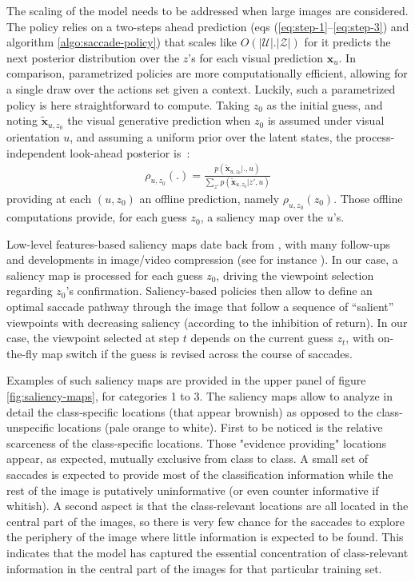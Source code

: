 \documentclass{article}
\begin{document}
The scaling of the model needs to be addressed when large images are considered. The policy relies on a two-steps ahead prediction (eqs (\ref{eq:step-1}--\ref{eq:step-3}) and algorithm \ref{algo:saccade-policy}) that scales like $O(|\mathcal{U}|.|\mathcal{Z}|)$ for it predicts the next posterior distribution over the $z$'s for each visual prediction $\boldsymbol{x}_u$. In comparison, parametrized policies are more computationally efficient, allowing for a single draw over the actions set given a context.
Luckily, such a parametrized policy is here straightforward to compute. Taking $z_0$ as the initial guess, and noting $\tilde{\boldsymbol{x}}_{u,z_0}$ the visual generative prediction when $z_0$ is assumed under visual orientation $u$, and assuming a uniform prior over the latent states, the process-independent look-ahead posterior is~:
\begin{align}
\rho_{u, z_0} (.)=  \frac{p(\tilde{\boldsymbol{x}}_{u, z_0}|.,u)}{\sum_{z'} p(\tilde{\boldsymbol{x}}_{u, z_0}|z',u)}
\end{align}
providing at each $(u, z_0)$ an offline prediction, namely $\rho_{u, z_0}(z_0)$. Those offline computations provide, for each guess $z_0$, a saliency map over the $u$'s. 

Low-level features-based saliency maps date back from \cite{itti2001computational}, with many follow-ups and developments in image/video compression (see for instance \cite{wang2003foveation}). In our case, a saliency map is processed for each guess $z_0$, driving the viewpoint selection regarding $z_0$'s confirmation.
Saliency-based policies then allow to define an optimal saccade pathway through the image that follow a sequence of ``salient'' viewpoints with decreasing saliency (according to the inhibition of return).
In our case, the viewpoint selected at step $t$ depends on the current guess $z_t$, with on-the-fly map switch if the guess is revised across the course of saccades.

Examples of such saliency maps are provided in the upper panel of figure \ref{fig:saliency-maps}, for categories 1 to 3. The saliency maps allow to analyze in detail the class-specific locations (that appear brownish) as opposed to the class-unspecific locations (pale orange to white). First to be noticed is the relative scarceness of the class-specific locations. Those "evidence providing" locations appear, as expected, mutually exclusive from class to class. A small set of saccades is expected to provide most of the classification information while the rest of the image is putatively uninformative (or even counter informative if whitish). A second aspect is that the class-relevant locations are all located in the central part of the images, so there is very few chance for the saccades to explore the periphery of the image where little information is expected to be found. This indicates that the model has captured the essential concentration of class-relevant information in the central part of the images for that particular training set.
\end{document}
